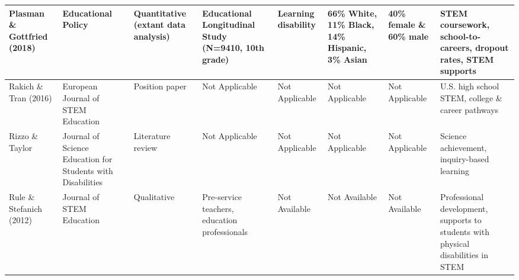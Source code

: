 \documentclass[11.5pt]{sig-alternate}
\begin{document}
\begin{@twocolumnfalse}
\begin{table}
\begin{tabular}{m{0.72in}m{0.72in}m{0.72in}m{0.72in}m{0.72in}m{0.72in}m{0.72in}m{0.72in}}
Plasman \&  Gottfried (2018)                         & Educational Policy                                              & Quantitative (extant data analysis)   & Educational Longitudinal Study (N=9410, 10th grade)                                          & Learning disability                               & 66\% White, 11\% Black, 14\% Hispanic, 3\% Asian                                                       & 40\% female \& 60\% male                                         & STEM coursework, school-to-careers, dropout rates, STEM supports                                         \\ \hline
Rakich \&  Tran (2016)                               & European Journal of STEM Education                              & Position paper                        &  \centering Not Applicable                                                                               &  \centering Not Applicable                                    &  \centering Not Applicable                                                                                         &  \centering Not Applicable                                                   & U.S. high school STEM, college \& career pathways                                                        \\ \hline
Rizzo \& Taylor                                         & Journal of Science Education for Students with Disabilities     & Literature review                     &  \centering Not Applicable                                                                               &  \centering Not Applicable                                    &  \centering Not Applicable                                                                                         &  \centering Not Applicable                                                   & Science achievement, inquiry-based learning                                                              \\ \hline
Rule \&  Stefanich (2012)                            & Journal of STEM Education                                       & Qualitative                           & Pre-service teachers, education professionals                                                &  \centering Not Available                                     &  \centering Not Available                                                                                          &  \centering Not Available                                                    & Professional development, supports to students with physical disabilities in STEM                        \\ \hline

\end{tabular}
\end{table}
\end{@twocolumnfalse}
\end{document}

